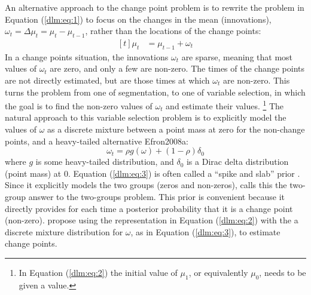 An alternative approach to the change point problem is to rewrite the problem in Equation (\ref{dlm:eq:1}) to focus on the changes in the mean (innovations), $\omega_{t} = \Delta \mu_{t} = \mu_{t} - \mu_{t - 1}$, rather than the locations of the change points:
\begin{equation}
  \label{dlm:eq:2}
  \begin{aligned}[t]
    \mu_{t} &= \mu_{t - 1} + \omega_{t}
  \end{aligned}
\end{equation}
In a change points situation, the innovations $\omega_{t}$ are sparse, meaning that most values of $\omega_{t}$ are zero, and only a few are non-zero.
The times of the change points are not directly estimated, but are those times at which $\omega_{t}$ are non-zero.
This turns the problem from one of segmentation, to one of variable selection, in which the goal is to find the non-zero values of $\omega_{t}$ and estimate their values.
\footnote{In Equation (\ref{dlm:eq:2}) the initial value of $\mu_{1}$, or equivalently $\mu_{0}$, needs to be given a value.
}
The natural approach to this variable selection problem is to explicitly model the values of $\omega$ as a discrete mixture between a point mass at zero for the non-change points, and a heavy-tailed alternative \textcite{MitchellBeauchamp1988a}{Efron2008a}:
\begin{equation}
  \label{dlm:eq:3}
  \omega_{t} = \rho g(\omega) + (1 - \rho) \delta_{0}
\end{equation}
where $g$ is some heavy-tailed distribution, and $\delta_{0}$ is a Dirac delta distribution (point mass) at 0.
Equation (\ref{dlm:eq:3}) is often called a ``spike and slab'' prior \textcite{MitchellBeauchamp1988a}.
Since it explicitly models the two groups (zeros and non-zeros), \textcite{Efron2008a} calls this the two-group answer to the two-groups problem.
This prior is convenient because it directly provides for each time a posterior probability that it is a change point (non-zero).
\textcite{GiordaniKohn2008} propose using the representation in Equation (\ref{dlm:eq:2}) with the a discrete mixture distribution for $\omega$, as in Equation (\ref{dlm:eq:3}), to estimate change points.

